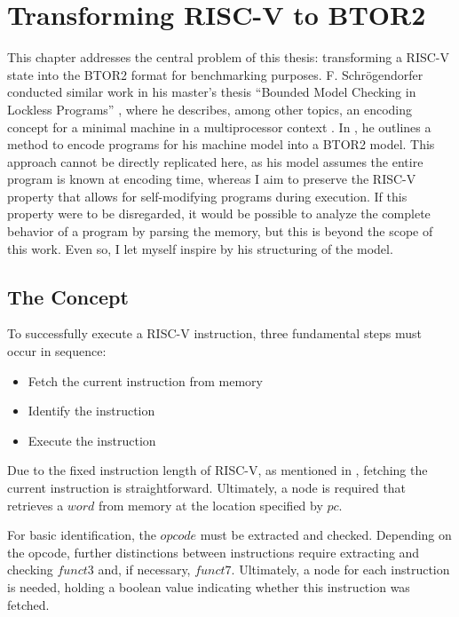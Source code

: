 \chapter{Transforming RISC-V to BTOR2}\label{chap:riscv_to_btor2}


This chapter addresses the central problem of this thesis:
transforming a RISC-V state into the BTOR2 format for benchmarking
purposes. F. Schrögendorfer conducted similar work in his master's
thesis \enquote{Bounded Model Checking in Lockless Programs}
\cite{bmcOfLockless}, where he describes, among other topics, an
encoding concept for a minimal machine in a multiprocessor context
\cite[Chapter 2]{bmcOfLockless}. In \cite[Chapter 8]{bmcOfLockless},
he outlines a method to encode programs for his machine model into a
BTOR2 model. This approach cannot be directly replicated here, as his
model assumes the entire program is known at encoding time, whereas I
aim to preserve the RISC-V property that allows for self-modifying
programs during execution. If this property were to be disregarded,
it would be possible to analyze the complete behavior of a program by
parsing the memory, but this is beyond the scope of this work. Even
so, I let myself inspire by his structuring of the model.

\section{The Concept}
To successfully execute a RISC-V instruction, three fundamental steps
must occur in sequence:
\begin{itemize}
    \item Fetch the current instruction from memory
    \item Identify the instruction
    \item Execute the instruction
\end{itemize}
Due to the fixed instruction length of RISC-V, as mentioned in , fetching the current instruction is straightforward. Ultimately, a node is required that retrieves a $word$ from memory at the location specified by $pc$.

For basic identification, the $opcode$ must be extracted and checked.
Depending on the opcode, further distinctions between instructions
require extracting and checking $funct3$ and, if necessary, $funct7$.
Ultimately, a node for each instruction is needed, holding a boolean
value indicating whether this instruction was fetched.

